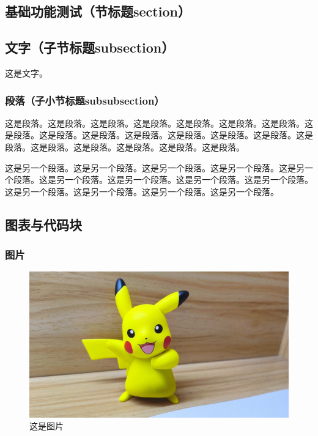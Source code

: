 \begin{ujnbody}
    \section{基础功能测试（节标题section）}
    \subsection{文字（子节标题subsection）}
    这是文字。
    \subsubsection{段落（子小节标题subsubsection）}
    这是段落。这是段落。这是段落。这是段落。这是段落。这是段落。这是段落。这是段落。这是段落。这是段落。这是段落。这是段落。这是段落。这是段落。这是段落。这是段落。这是段落。这是段落。这是段落。这是段落。

    这是另一个段落。这是另一个段落。这是另一个段落。这是另一个段落。这是另一个段落。这是另一个段落。这是另一个段落。这是另一个段落。这是另一个段落。这是另一个段落。这是另一个段落。这是另一个段落。这是另一个段落。
    \subsection{图表与代码块}
    \subsubsection{图片}
    \begin{figure}[htbp]
        \centering
        \includegraphics[scale=0.1]{figures/pikachu.jpg}
        \caption{这是图片}
        \label{fig:1}
    \end{figure}

\end{ujnbody}
